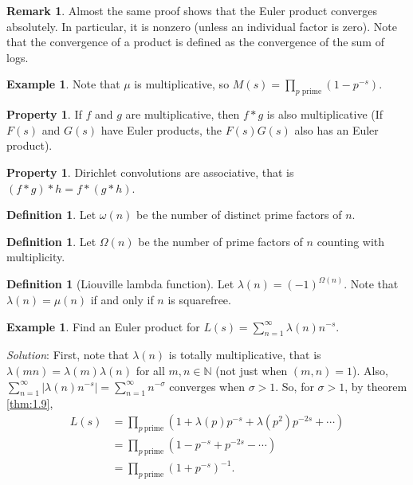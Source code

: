 \documentclass[11pt]{article}
\theoremstyle{definition}
\newtheorem{defn}[thm]{Definition}
\newtheorem{example}[thm]{Example}
\newtheorem{pty}[thm]{Property}
\newtheorem{remark}[thm]{Remark}
\newcommand{\s}[0]{\sigma}
\newcommand{\om}[0]{\omega}
\newcommand{\Om}[0]{\Omega}
\newcommand{\la}[0]{\lambda}
\newcommand{\abs}[1]{\left\lvert#1\right\rvert} %
\newcommand{\NN}{\mathbb{N}}
\begin{document}
\begin{remark}
Almost the same proof shows that the Euler product converges absolutely. In particular, it
is nonzero (unless an individual factor is zero). Note that the convergence of a product is
defined as the convergence of the sum of logs.
\end{remark}

\begin{example}
Note that $\mu$ is multiplicative, so $M(s)=\prod_{p\text{ prime}}(1-p^{-s})$.
\end{example}



\begin{pty}
If $f$ and $g$ are multiplicative, then $f*g$ is also multiplicative (If $F(s)$ and $G(s)$
have Euler products, the $F(s)G(s)$ also has an Euler product).
\end{pty}

\begin{pty}
Dirichlet convolutions are associative, that is $(f*g)*h = f*(g*h)$.
\end{pty}

\begin{defn}
Let $\om(n)$ be the number of distinct prime factors of $n$.
\end{defn}

\begin{defn}
Let $\Om(n)$ be the number of prime factors of $n$ counting with multiplicity.
\end{defn}

\begin{defn}[Liouville lambda function]
Let $\la(n)=(-1)^{\Om(n)}$. Note that $\la(n)=\mu(n)$ if and only if $n$ is squarefree.
\end{defn}

\begin{example}
Find an Euler product for $L(s)=\sum_{n=1}^\infty\la(n)n^{-s}$.

\emph{Solution}:
First, note that $\la(n)$ is totally multiplicative, that is $\la(mn)=\la(m)\la(n)$ for all
$m,n\in\NN$ (not just when $(m,n)=1$). Also, $\sum_{n=1}^\infty\abs{\la(n)n^{-s}} =
\sum_{n=1}^\infty n^{-\s}$ converges when $\s>1$. So, for $\s>1$, by theorem \ref{thm:1.9},
\begin{align*}
L(s) &= \prod_{p~\text{prime}} \left(1 + \la(p)p^{-s} + \la(p^2)p^{-2s} + \cdots \right) \\
&= \prod_{p~\text{prime}} \left(1 - p^{-s} + p^{-2s} - \cdots \right) \\
&= \prod_{p~\text{prime}} \left(1+p^{-s}\right)^{-1} .
\end{align*}
\end{example}
\end{document}
